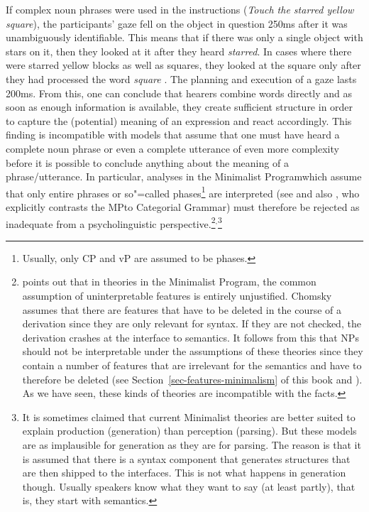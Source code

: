 If complex noun phrases were used in the instructions (\emph{Touch the starred yellow
  square}), the participants' gaze fell on the object in question 250ms after it was unambiguously identifiable.
  This means that if there was only a single object with stars on it, then they looked at it after they heard
  \emph{starred}. In cases where there were starred yellow blocks as well as squares, they looked at the square
  only after they had processed the word \emph{square} \citep[]{TSKES95a}.
The planning and execution of a gaze lasts 200ms. From this, one can conclude that hearers combine words directly
and as soon as enough information is available, they create sufficient structure in order to capture
the (potential) meaning of an expression and react accordingly.
This finding is incompatible with models that assume that one must have heard a complete noun phrase or even a complete utterance
of even more complexity before it is possible to conclude anything about the meaning of a phrase/utterance. 
In particular, analyses in the Minimalist Program\indexmp which assume that only entire phrases or so"=called phases\footnote{
     Usually, only CP and vP are assumed to be phases.
}
are interpreted (see \citealp{Chomsky99a} and also \citealp[]{Marantz2005a}, who explicitly contrasts the
MP\indexmp to Categorial Grammar\indexcg) must therefore be rejected as inadequate from a psycholinguistic perspective.\footnote{
\citet[--730]{Sternefeld2006a-u} points out that in theories in the Minimalist Program, the common assumption of uninterpretable
features is entirely unjustified. Chomsky assumes that there are features that have to be deleted in the course of a derivation
since they are only relevant for syntax. If they are not checked, the derivation crashes at the interface to semantics.
It follows from this that NPs should not be interpretable under the assumptions of these theories since they contain a number of features
that are irrelevant for the semantics and have to therefore be deleted (see
Section~\ref{sec-features-minimalism} of this book and \citealp{Richards2015a}).
As we have seen, these kinds of theories are incompatible with the facts.
}$^,$\footnote{
  It is sometimes claimed that current Minimalist theories are better suited to explain production (generation)
  than perception (parsing). But these models are as implausible for generation as they are for parsing. The
  reason is that it is assumed that there is a syntax component that generates structures that are
  then shipped to the interfaces. This is not what happens in generation though. Usually speakers
  know what they want to say (at least partly), that is, they start with semantics.
}

